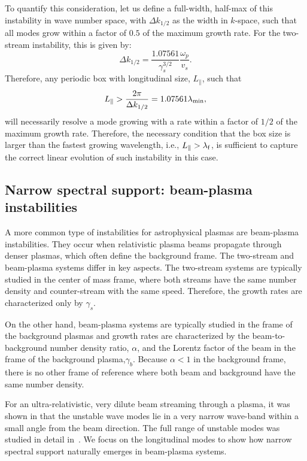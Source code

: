 \documentclass[pop,numberedappendix,iop]{aeb_emulateapj_2015}
\begin{document}
To quantify this consideration, let us define a full-width, half-max of this instability in wave number space, with $\Delta k_{1/2}$ as the width in $k$-space, such that all modes grow within a factor of $0.5$ of the maximum growth rate. For the two-stream instability, this is given by:
\begin{equation}
\Delta k_{1/2} =  \frac{1.07561}{ \gamma_s^{3/2}} \frac{ \omega_p}{v_s}.
\end{equation}
Therefore, any periodic box with longitudinal size, $L_{\parallel}$, such that 
\begin{equation}
L_{\parallel} > \frac{2\pi}{\Delta k_{1/2}} =   1.07561 \lambda_{\rm min},
\end{equation}
will necessarily resolve a mode growing with a rate within a factor of $1/2$ of the maximum growth rate.
Therefore, the necessary condition that the box size is larger than the fastest growing wavelength, i.e., $L_{\parallel} > {\lambda}_{\rm f}$, is sufficient to capture the correct linear evolution of such instability in this case. 




\subsection{Narrow spectral support: beam-plasma  instabilities}




A more common type of instabilities for astrophysical plasmas are beam-plasma instabilities. They occur when relativistic plasma beams propagate through denser plasmas, which often define the background frame. 
The two-stream and beam-plasma systems differ in key aspects.
The two-stream systems are typically studied in the center of mass frame, where both streams have the same number density and counter-stream with the same speed.
Therefore, the growth rates are characterized only by $\gamma_s$.

On the other hand, beam-plasma systems are typically studied in the frame of the background plasmas and growth rates are characterized by the beam-to-background number density ratio, $\alpha$, and the Lorentz factor of the beam in the frame of the background plasma,$\gamma_b$.
Because $\alpha<1$ in the background frame, there is no other frame of reference where both beam and background have the same number density.



For an ultra-relativistic, very dilute beam streaming through a plasma, it was shown in \citet{Bret2006} that the unstable wave modes lie in a very narrow wave-band within a small angle from the beam direction. The full range of unstable modes was studied in detail in~\citet{Bret2010}.
We focus on the longitudinal modes to show how narrow spectral support naturally emerges in beam-plasma systems.
\end{document}
